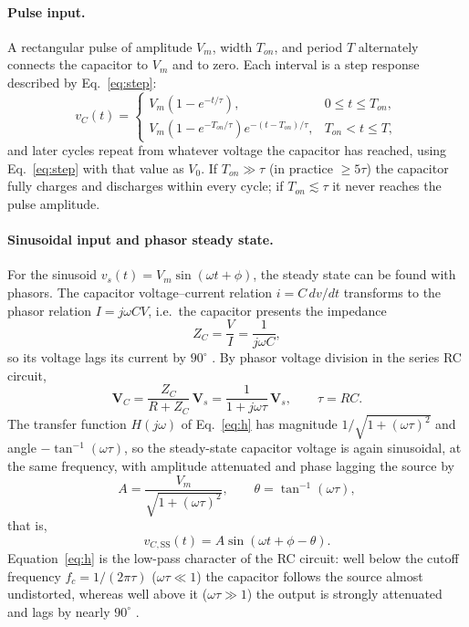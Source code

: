 \documentclass[12pt,a4paper]{article}
\begin{document}
	\paragraph{Pulse input.}
	A rectangular pulse of amplitude $V_m$, width $T_{on}$, and period $T$
	alternately connects the capacitor to $V_m$ and to zero.  Each
	interval is a step response described by Eq.~\eqref{eq:step}:
	\begin{equation}
		v_C(t) =
		\begin{cases}
			V_m\left(1 - e^{-t/\tau}\right), & 0 \le t \le T_{on}, \\[4pt]
			V_m\left(1 - e^{-T_{on}/\tau}\right) e^{-(t - T_{on})/\tau},
			& T_{on} < t \le T,
		\end{cases}
		\label{eq:pulse}
	\end{equation}
	and later cycles repeat from whatever voltage the capacitor has
	reached, using Eq.~\eqref{eq:step} with that value as $V_0$.  If
	$T_{on} \gg \tau$ (in practice $\ge 5\tau$) the capacitor fully
	charges and discharges within every cycle; if $T_{on} \lesssim \tau$
	it never reaches the pulse amplitude.
	
	\paragraph{Sinusoidal input and phasor steady state.}
	For the sinusoid $v_s(t) = V_m \sin(\omega t + \phi)$, the steady
	state can be found with phasors.  The capacitor voltage--current
	relation $i = C\,dv/dt$ transforms to the phasor relation
	$I = j\omega C V$, i.e.\ the capacitor presents the impedance
	\begin{equation}
		Z_C = \frac{V}{I} = \frac{1}{j\omega C},
		\label{eq:zc}
	\end{equation}
	so its voltage lags its current by $90^\circ$ \cite{sadiku}.  By
	phasor voltage division in the series RC circuit,
	\begin{equation}
		\mathbf{V}_C = \frac{Z_C}{R + Z_C}\,\mathbf{V}_s
		= \frac{1}{1 + j\omega\tau}\,\mathbf{V}_s,
		\qquad \tau = RC .
		\label{eq:h}
	\end{equation}
	The transfer function $H(j\omega)$ of
	Eq.~\eqref{eq:h} has magnitude $1/\sqrt{1 + (\omega\tau)^2}$ and
	angle $-\tan^{-1}(\omega\tau)$, so the steady-state capacitor
	voltage is
	again sinusoidal, at the same frequency, with amplitude attenuated
	and phase lagging the source by
	\begin{equation}
		A = \frac{V_m}{\sqrt{1 + (\omega\tau)^2}}, \qquad
		\theta = \tan^{-1}(\omega\tau),
		\label{eq:amp-lag}
	\end{equation}
	that is,
	\begin{equation}
		v_{C,\mathrm{SS}}(t) = A \sin(\omega t + \phi - \theta).
		\label{eq:ss}
	\end{equation}
	Equation~\eqref{eq:h} is the low-pass character of the RC circuit:
	well below the cutoff frequency $f_c = 1/(2\pi\tau)$
	($\omega\tau \ll 1$) the capacitor follows the source almost
	undistorted, whereas well above it ($\omega\tau \gg 1$) the output is
	strongly attenuated and lags by nearly $90^\circ$ \cite{sadiku}.
	
\end{document}
